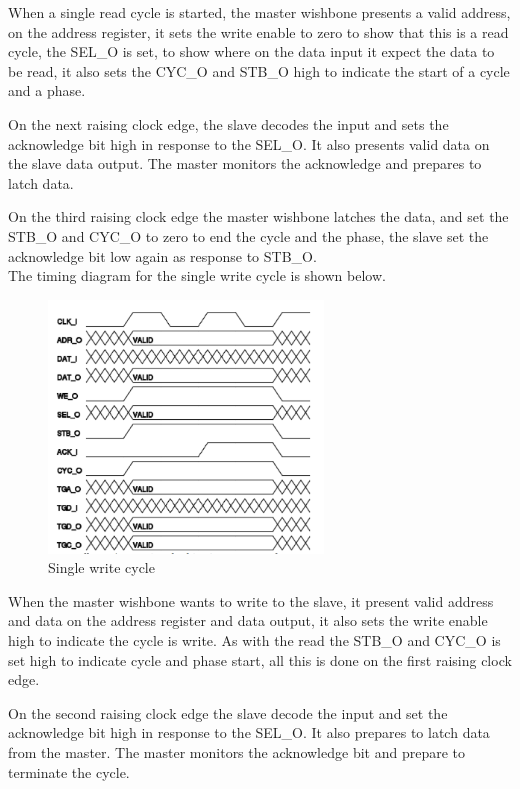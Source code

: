 When a single read cycle is started, the master wishbone presents a valid address, on the address register, it sets the write enable to zero to show that this is a read cycle, the SEL\_O is set, to show where on the data input it expect the data to be read, it also sets the CYC\_O and STB\_O high to indicate the start of a cycle and a phase.

On the next raising clock edge, the slave decodes the input and sets the acknowledge bit high in response to the SEL\_O. It also presents valid data on the slave data output. The master monitors the acknowledge and prepares to latch data.


On the third raising clock edge the master wishbone latches the data, and set the STB\_O and CYC\_O to zero to end the cycle and the phase, the slave set the acknowledge bit low again as response to STB\_O.\\
The timing diagram for the single write cycle is shown below.
\begin{figure}[H]
	\begin{centering}
		 \includegraphics[width=0.65\textwidth]{images/wb_single_write.png}
		\caption{Single write cycle}
	\end{centering}
\end{figure}
When the master wishbone wants to write to the slave, it present valid address and data on the address register and data output, it also sets the write enable high to indicate the cycle is write. As with the read the STB\_O and CYC\_O is set high to indicate cycle and phase start, all this is done on the first raising clock edge.

On the second raising clock edge the slave decode the input and set the acknowledge bit high in response to the SEL\_O. It also prepares to latch data from the master. The master monitors the acknowledge bit and prepare to terminate the cycle.

